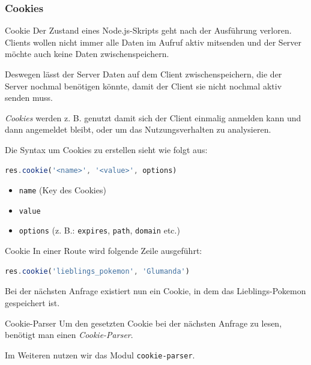 \subsubsection{Cookies}

\begin{defi}{Cookie}
    Der Zustand eines Node.js-Skripts geht nach der Ausführung verloren.
    Clients wollen nicht immer alle Daten im Aufruf aktiv mitsenden und der Server möchte auch keine Daten zwischenspeichern.

    Deswegen lässt der Server Daten auf dem Client zwischenspeichern, die der Server nochmal benötigen könnte, damit der Client sie nicht nochmal aktiv senden muss.

    \emph{Cookies} werden z. B. genutzt damit sich der Client einmalig anmelden kann und dann angemeldet bleibt, oder um das Nutzungsverhalten zu analysieren.

    Die Syntax um Cookies zu erstellen sieht wie folgt aus:
    \begin{lstlisting}[language=JavaScript]
        res.cookie('<name>', '<value>', options)
    \end{lstlisting}

    \begin{itemize}
        \item \texttt{name} (Key des Cookies)
        \item \texttt{value}
        \item \texttt{options} (z. B.: \texttt{expires}, \texttt{path}, \texttt{domain} etc.)
    \end{itemize}
\end{defi}

\begin{example}{Cookie}
    In einer Route wird folgende Zeile ausgeführt:

    \begin{lstlisting}[language=JavaScript]
        res.cookie('lieblings_pokemon', 'Glumanda')
    \end{lstlisting}

    Bei der nächsten Anfrage existiert nun ein Cookie, in dem das Lieblings-Pokemon gespeichert ist.
\end{example}

\begin{bonus}{Cookie-Parser}
    Um den gesetzten Cookie bei der nächsten Anfrage zu lesen, benötigt man einen \emph{Cookie-Parser}.

    Im Weiteren nutzen wir das Modul \texttt{cookie-parser}.
\end{bonus}

